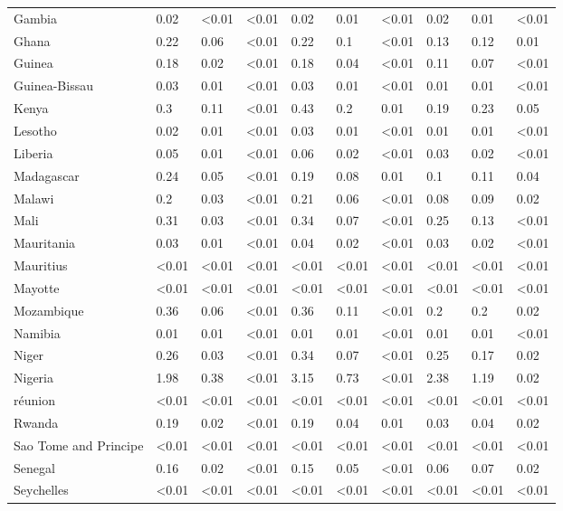 \begin{longtable}[t]{llllllllll}
Gambia & 0.02 & <0.01 & <0.01 & 0.02 & 0.01 & <0.01 & 0.02 & 0.01 & <0.01\\
Ghana & 0.22 & 0.06 & <0.01 & 0.22 & 0.1 & <0.01 & 0.13 & 0.12 & 0.01\\
\addlinespace
Guinea & 0.18 & 0.02 & <0.01 & 0.18 & 0.04 & <0.01 & 0.11 & 0.07 & <0.01\\
Guinea-Bissau & 0.03 & 0.01 & <0.01 & 0.03 & 0.01 & <0.01 & 0.01 & 0.01 & <0.01\\
Kenya & 0.3 & 0.11 & <0.01 & 0.43 & 0.2 & 0.01 & 0.19 & 0.23 & 0.05\\
Lesotho & 0.02 & 0.01 & <0.01 & 0.03 & 0.01 & <0.01 & 0.01 & 0.01 & <0.01\\
Liberia & 0.05 & 0.01 & <0.01 & 0.06 & 0.02 & <0.01 & 0.03 & 0.02 & <0.01\\
\addlinespace
Madagascar & 0.24 & 0.05 & <0.01 & 0.19 & 0.08 & 0.01 & 0.1 & 0.11 & 0.04\\
Malawi & 0.2 & 0.03 & <0.01 & 0.21 & 0.06 & <0.01 & 0.08 & 0.09 & 0.02\\
Mali & 0.31 & 0.03 & <0.01 & 0.34 & 0.07 & <0.01 & 0.25 & 0.13 & <0.01\\
Mauritania & 0.03 & 0.01 & <0.01 & 0.04 & 0.02 & <0.01 & 0.03 & 0.02 & <0.01\\
Mauritius & <0.01 & <0.01 & <0.01 & <0.01 & <0.01 & <0.01 & <0.01 & <0.01 & <0.01\\
\addlinespace
Mayotte & <0.01 & <0.01 & <0.01 & <0.01 & <0.01 & <0.01 & <0.01 & <0.01 & <0.01\\
Mozambique & 0.36 & 0.06 & <0.01 & 0.36 & 0.11 & <0.01 & 0.2 & 0.2 & 0.02\\
Namibia & 0.01 & 0.01 & <0.01 & 0.01 & 0.01 & <0.01 & 0.01 & 0.01 & <0.01\\
Niger & 0.26 & 0.03 & <0.01 & 0.34 & 0.07 & <0.01 & 0.25 & 0.17 & 0.02\\
Nigeria & 1.98 & 0.38 & <0.01 & 3.15 & 0.73 & <0.01 & 2.38 & 1.19 & 0.02\\
\addlinespace
réunion & <0.01 & <0.01 & <0.01 & <0.01 & <0.01 & <0.01 & <0.01 & <0.01 & <0.01\\
Rwanda & 0.19 & 0.02 & <0.01 & 0.19 & 0.04 & 0.01 & 0.03 & 0.04 & 0.02\\
Sao Tome and Principe & <0.01 & <0.01 & <0.01 & <0.01 & <0.01 & <0.01 & <0.01 & <0.01 & <0.01\\
Senegal & 0.16 & 0.02 & <0.01 & 0.15 & 0.05 & <0.01 & 0.06 & 0.07 & 0.02\\
Seychelles & <0.01 & <0.01 & <0.01 & <0.01 & <0.01 & <0.01 & <0.01 & <0.01 & <0.01\\

\end{longtable}
